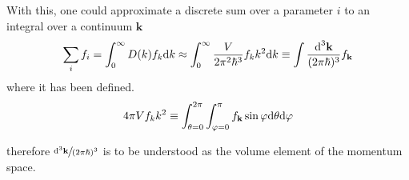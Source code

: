 With this, one could approximate a discrete sum over a parameter $i$ to an integral over a continuum $\mathbf{k}$
\begin{equation}
	\sum_i f_i=\int_0^\infty D(k)f_k\text{d} k\approx\int_0^\infty\frac{V}{2\pi^2\hbar^3} f_k k^2\text{d} k\equiv\int\frac{\text{d}^3\mathbf{k}}{(2\pi\hbar)^3}f_\mathbf{k}
\end{equation}
where it has been defined.
\begin{equation}
	4\pi V f_k k^2\equiv \int_{\theta=0}^{2\pi}\int_{\varphi=0}^\pi f_\mathbf{k}\sin\varphi \text{d}\theta\text{d}\varphi
\end{equation}

therefore $\sfrac{\text{d}^3\mathbf{k}}{(2\pi\hbar)^3}$ is to be understood as the volume element of the momentum space.